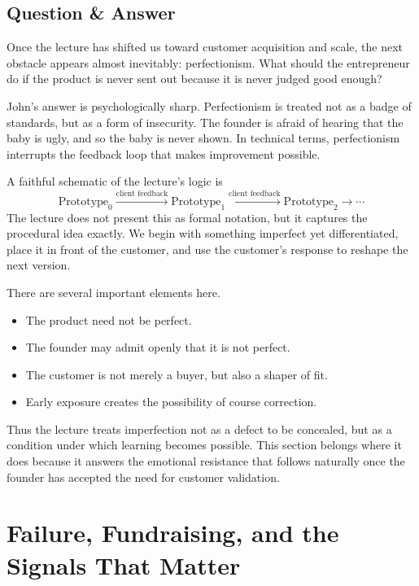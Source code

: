 \subsection{Question \& Answer}

Once the lecture has shifted us toward customer acquisition and scale, the next obstacle appears almost inevitably: perfectionism. What should the entrepreneur do if the product is never sent out because it is never judged good enough?

John's answer is psychologically sharp. Perfectionism is treated not as a badge of standards, but as a form of insecurity. The founder is afraid of hearing that the baby is ugly, and so the baby is never shown. In technical terms, perfectionism interrupts the feedback loop that makes improvement possible.

A faithful schematic of the lecture's logic is
\begin{equation}
\text{Prototype}_0
\xrightarrow{\text{client feedback}}
\text{Prototype}_1
\xrightarrow{\text{client feedback}}
\text{Prototype}_2
\rightarrow \cdots
\end{equation}
The lecture does not present this as formal notation, but it captures the procedural idea exactly. We begin with something imperfect yet differentiated, place it in front of the customer, and use the customer's response to reshape the next version.

There are several important elements here.
\begin{itemize}
\item The product need not be perfect.
\item The founder may admit openly that it is not perfect.
\item The customer is not merely a buyer, but also a shaper of fit.
\item Early exposure creates the possibility of course correction.
\end{itemize}

Thus the lecture treats imperfection not as a defect to be concealed, but as a condition under which learning becomes possible. This section belongs where it does because it answers the emotional resistance that follows naturally once the founder has accepted the need for customer validation.

\section{Failure, Fundraising, and the Signals That Matter}


